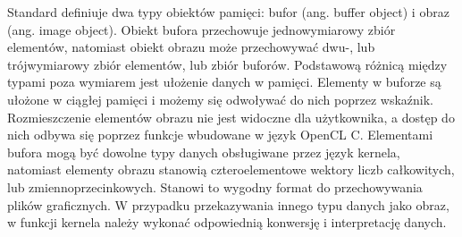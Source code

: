 Standard definiuje dwa typy obiektów pamięci: bufor (ang. buffer object) i obraz (ang. image object). Obiekt bufora przechowuje jednowymiarowy zbiór elementów, natomiast obiekt obrazu może przechowywać dwu-, lub trójwymiarowy zbiór elementów, lub zbiór buforów. Podstawową różnicą między typami poza wymiarem jest ułożenie danych w pamięci. Elementy w buforze są ułożone w ciągłej pamięci i możemy się odwoływać do nich poprzez wskaźnik. Rozmieszczenie elementów obrazu nie jest widoczne dla użytkownika, a dostęp do nich odbywa się poprzez funkcje wbudowane w język OpenCL C. Elementami bufora mogą być dowolne typy danych obsługiwane przez język kernela, natomiast elementy obrazu stanowią czteroelementowe wektory liczb całkowitych, lub zmiennoprzecinkowych. Stanowi to wygodny format do przechowywania plików graficznych. W przypadku przekazywania innego typu danych jako obraz, w funkcji kernela należy wykonać odpowiednią konwersję i interpretację danych.














